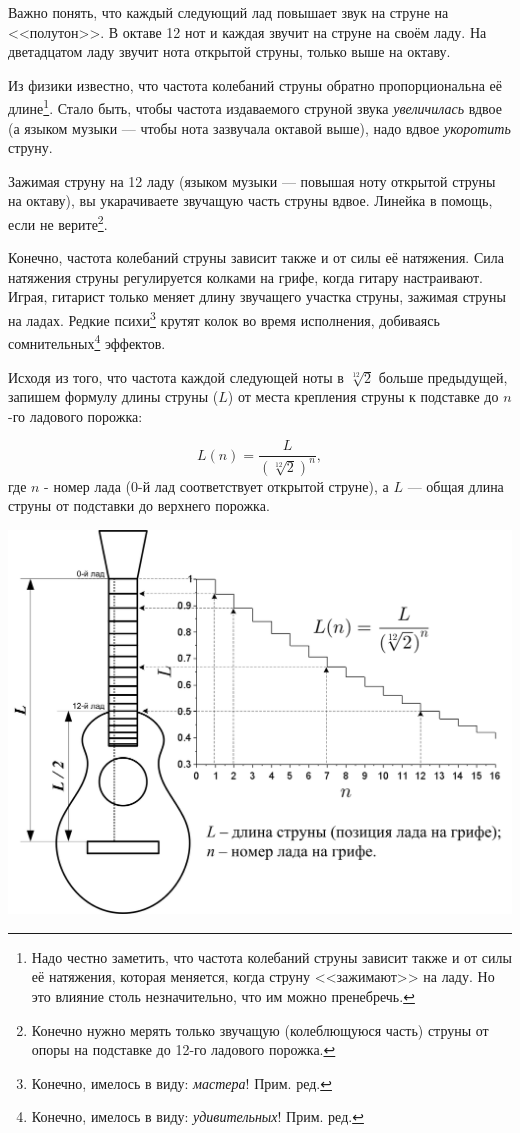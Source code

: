 Важно понять, что каждый следующий лад повышает звук на струне на <<полутон>>. В октаве 12 нот и каждая звучит на струне на своём ладу. На дветадцатом ладу звучит нота открытой струны, только выше на октаву.

Из физики известно, что частота колебаний струны обратно пропорциональна её длине\footnote{Надо честно заметить, что частота колебаний струны зависит также и от силы её натяжения, которая меняется, когда струну <<зажимают>> на ладу. Но это влияние столь незначительно, что им можно пренебречь.}. Стало быть, чтобы частота издаваемого струной звука \emph{увеличилась} вдвое (а языком музыки --- чтобы нота зазвучала октавой выше), надо вдвое \emph{укоротить} струну. 

Зажимая струну на 12 ладу (языком музыки --- повышая ноту открытой струны на октаву), вы укарачиваете звучащую часть струны вдвое. Линейка в помощь, если не верите\footnote{Конечно нужно мерять только звучащую (колеблющуюся часть) струны от опоры на подставке до 12-го ладового порожка.}.

Конечно, частота колебаний струны зависит также и от силы её натяжения. Сила натяжения струны регулируется колками на грифе, когда гитару настраивают. Играя, гитарист только меняет длину звучащего участка струны, зажимая струны на ладах. Редкие психи\footnote{Конечно, имелось в виду: \emph{мастера}! Прим. ред.} крутят колок во время исполнения, добиваясь сомнительных\footnote{Конечно, имелось в виду: \emph{удивительных}! Прим. ред.} эффектов.

Исходя из того, что частота каждой следующей ноты в $\sqrt[12]{2}$ больше предыдущей, запишем формулу длины струны ($L$) от места крепления струны к подставке до $n$-го ладового порожка:

\[L(n)=\frac{L}{(\sqrt[12]{2})^n},\]
где $n$ - номер лада ($0$-й лад соответствует открытой струне), а $L$ --- общая длина струны от подставки до верхнего порожка.


\includegraphics{fig/string-length.png}


